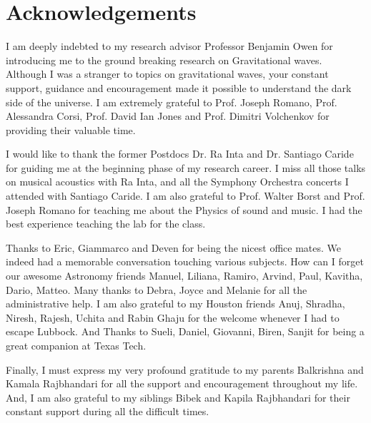 \documentclass{ttuthes2007}
\begin{document}
\frontmatter


\chapter{\textbf{Acknowledgements}}
I am  deeply indebted to my research advisor Professor Benjamin Owen for
introducing me to the ground breaking research on Gravitational waves. Although
I was a stranger to topics on gravitational waves, your constant support,
guidance and encouragement made it possible to understand the dark side of
the universe.  I am extremely grateful to  Prof. Joseph
Romano, Prof. Alessandra Corsi, Prof. David Ian Jones and Prof. Dimitri
Volchenkov for providing their valuable time. 

I would like to thank the former Postdocs Dr. Ra Inta and Dr. Santiago Caride for
guiding me at the beginning phase of my research career. I miss all those talks
on musical acoustics with Ra Inta, and all the Symphony Orchestra concerts I
attended with Santiago Caride. I am also grateful to Prof. Walter Borst and
Prof. Joseph Romano for teaching me about the Physics of sound and music. I had
the best experience teaching the lab for the class. 

Thanks to Eric, Giammarco and Deven for being the nicest office mates. We indeed
had a memorable conversation touching various subjects. How can I forget our
awesome Astronomy friends Manuel, Liliana, Ramiro, Arvind, Paul, Kavitha, Dario,
Matteo. Many thanks to Debra, Joyce and Melanie for all the
administrative help. I am also grateful to my Houston friends Anuj, Shradha,
Niresh, Rajesh, Uchita and Rabin Ghaju for the welcome whenever I had to escape
Lubbock. And Thanks to Sueli, Daniel, Giovanni, Biren, Sanjit for being a great companion at Texas Tech. 

Finally, I must express my very profound gratitude to my parents Balkrishna and
Kamala Rajbhandari for all the support and encouragement throughout my life.
And, I am also grateful to my siblings Bibek and Kapila Rajbhandari for their
constant support during all the difficult times.
 

\newpage
\end{document}
